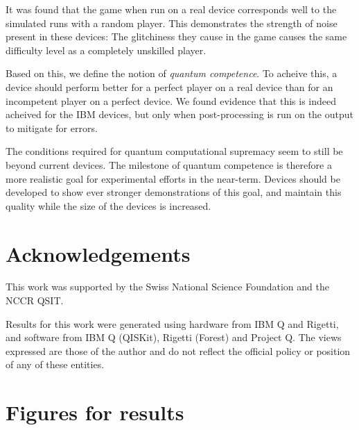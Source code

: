 \documentclass[aps,prl,twocolumn,showpacs,preprintnumbers]{revtex4-1}
\begin{document}
It was found that the game when run on a real device corresponds well to the simulated runs with a random player. This demonstrates the strength of noise present in these devices: The glitchiness they cause in the game causes the same difficulty level as a completely unskilled player.

Based on this, we define the notion of \textit{quantum competence}. To acheive this, a device should perform better for a perfect player on a real device than for an incompetent player on a perfect device. We found evidence that this is indeed acheived for the IBM devices, but only when post-processing is run on the output to mitigate for errors.

The conditions required for quantum computational supremacy seem to still be beyond current devices. The milestone of quantum competence is therefore a more realistic goal for experimental efforts in the near-term. Devices should be developed to show ever stronger demonstrations of this goal, and maintain this quality while the size of the devices is increased.





\section{Acknowledgements}

This work was supported by the Swiss National Science Foundation and the NCCR QSIT.

Results for this work were generated using hardware from IBM Q and Rigetti, and software from IBM Q (QISKit), Rigetti (Forest) and Project Q. The views expressed are those of the author and do not reflect the official policy or position of any of these entities.




\appendix

\section{Figures for results}

\pagebreak
\end{document}
